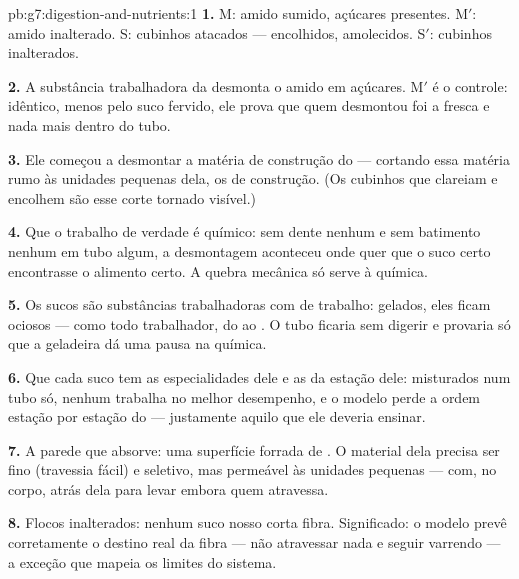 \begin{solution}{pb:g7:digestion-and-nutrients:1}
\textbf{1.} M: amido sumido, açúcares presentes. M$'$: amido
inalterado. S: cubinhos atacados --- encolhidos, amolecidos. S$'$:
cubinhos inalterados.

\textbf{2.} A substância trabalhadora da  desmonta o amido em
açúcares. M$'$ é o controle: idêntico, menos pelo suco fervido, ele
prova que quem desmontou foi a  fresca e nada mais dentro do
tubo.

\textbf{3.} Ele começou a desmontar a matéria de construção do  ---
cortando essa matéria rumo às unidades pequenas dela, os  de
construção. (Os cubinhos que clareiam e encolhem são esse corte
tornado visível.)

\textbf{4.} Que o trabalho de verdade é químico: sem dente nenhum e
sem batimento nenhum em tubo algum, a desmontagem aconteceu onde quer
que o suco certo encontrasse o alimento certo. A quebra mecânica só
serve à química.

\textbf{5.} Os sucos são substâncias trabalhadoras com  de
trabalho: gelados, eles ficam ociosos --- como todo trabalhador, do
 ao . O tubo ficaria sem digerir e provaria só que
a geladeira dá uma pausa na química.

\textbf{6.} Que cada suco tem as especialidades dele e as  da
estação dele: misturados num tubo só, nenhum trabalha no melhor
desempenho, e o modelo perde a ordem estação por estação do  --- justamente aquilo que ele deveria ensinar.

\textbf{7.} A parede que absorve: uma superfície forrada de
. O material dela precisa ser fino (travessia fácil) e
seletivo, mas permeável às unidades pequenas --- com, no corpo,  atrás dela para levar embora quem atravessa.

\textbf{8.} Flocos inalterados: nenhum suco nosso corta fibra.
Significado: o modelo prevê corretamente o destino real da fibra ---
não atravessar nada e seguir varrendo --- a exceção que mapeia os
limites do sistema.


\end{solution}
